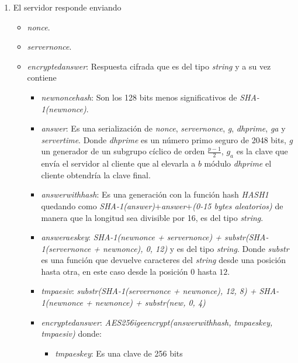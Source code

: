 \begin{enumerate}
	\item El servidor responde enviando
		\begin{itemize}
			\item \emph{nonce}.
			\item \emph{server\textunderscore nonce}.
			\item \emph{encrypted\textunderscore answer}: Respuesta cifrada que es del tipo \emph{string} y a su vez contiene
			\begin{itemize}
				\item \emph{new\textunderscore nonce\textunderscore hash}: Son los 128 bits menos significativos de \emph{SHA-1(new\textunderscore nonce)}.
				\item \emph{answer}: Es una serialización de \emph{nonce}, \emph{server\textunderscore nonce}, \emph{g}, \emph{dh\textunderscore prime}, \emph{g\textunderscore a} y \emph{server\textunderscore time}. Donde \emph{dh\textunderscore prime} es un número primo seguro de 2048 bits, \emph{g} un generador de un subgrupo cíclico de orden $\frac{p-1}{2}$, $g_a$ es la clave que envía el servidor al cliente que al elevarla a $b$ módulo \emph{dh\textunderscore prime} el cliente obtendría la clave final.
\item \emph{answer\textunderscore with\textunderscore hash}: Es una generación con la función hash \emph{HASH1} quedando como \emph{SHA-1(answer)}+\emph{answer}+\emph{(0-15 bytes aleatorios)} de manera que la longitud sea divisible por 16, es del tipo \emph{string}.
				\item \emph{answer\textunderscore aes\textunderscore key}: \emph{SHA-1(new\textunderscore nonce + server\textunderscore nonce) + substr(SHA-1(server\textunderscore nonce + new\textunderscore nonce), 0, 12)} y es del tipo \emph{string}. Donde \emph{substr} es una función que devuelve caracteres del \emph{string} desde una posición hasta otra, en este caso desde la posición $0$ hasta $12$.
				\item \emph{tmp\textunderscore aes\textunderscore iv}: \emph{substr(SHA-1(server\textunderscore nonce + new\textunderscore nonce), 12, 8) + SHA-1(new\textunderscore nonce + new\textunderscore nonce) + substr(new\textunderscore, 0, 4)}
				\item \emph{encrypted\textunderscore answer}: \emph{AES256\textunderscore ige\textunderscore encrypt(answer\textunderscore with\textunderscore hash, tmp\textunderscore aes\textunderscore key, tmp\textunderscore aes\textunderscore iv)} donde:
				\begin{itemize}
					\item \emph{tmp\textunderscore aes\textunderscore key}: Es una clave de 256 bits

\end{itemize}
\end{itemize}
\end{itemize}
\end{enumerate}
